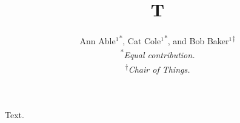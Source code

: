 \documentclass{article}
\title{T}
\author{Ann Able$^{1}$\textsuperscript{*}, Cat Cole$^{1}$\textsuperscript{*}, and Bob Baker$^{1}$\textsuperscript{$\dagger$}\\ \textsuperscript{*}\textit{Equal contribution.}\\ \textsuperscript{$\dagger$}\textit{Chair of Things.}}
\begin{document}
\maketitle
Text.
\end{document}
